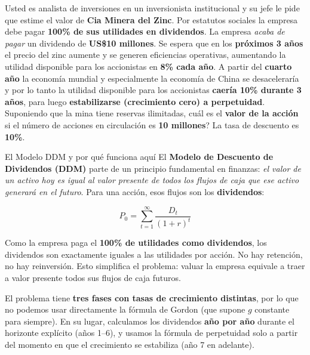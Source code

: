 \documentclass[12pt,a4paper]{article}
\begin{document}
\begin{cajaenunciado}
Usted es analista de inversiones en un inversionista institucional y su jefe le pide que estime
el valor de \textbf{Cia Minera del Zinc}. Por estatutos sociales la empresa debe pagar
\textbf{100\% de sus utilidades en dividendos}. La empresa \emph{acaba de pagar} un dividendo
de \textbf{US\$10 millones}. Se espera que en los \textbf{pr\'oximos 3 a\~nos} el precio del
zinc aumente y se generen eficiencias operativas, aumentando la utilidad disponible para los
accionistas en \textbf{8\% cada a\~no}. A partir del \textbf{cuarto a\~no} la econom\'ia
mundial y especialmente la econom\'ia de China se desaceleraría y por lo tanto la utilidad
disponible para los accionistas \textbf{caer\'ia 10\% durante 3 a\~nos}, para luego
\textbf{estabilizarse (crecimiento cero) a perpetuidad}. Suponiendo que la mina tiene reservas
ilimitadas, \textquestiondown cu\'al es el \textbf{valor de la acci\'on} si el n\'umero de
acciones en circulaci\'on es \textbf{10 millones}? La tasa de descuento es \textbf{10\%}.
\end{cajaenunciado}

\vspace{0.5cm}

\begin{cajaintuicion}{El Modelo DDM y por qu\'e funciona aqu\'i}
El \textbf{Modelo de Descuento de Dividendos (DDM)} parte de un principio fundamental en
finanzas: \textit{el valor de un activo hoy es igual al valor presente de todos los flujos
de caja que ese activo generar\'a en el futuro}. Para una acci\'on, esos flujos son los
\textbf{dividendos}:

\[
P_0 = \sum_{t=1}^{\infty} \frac{D_t}{(1+r)^t}
\]

Como la empresa paga el \textbf{100\% de utilidades como dividendos}, los dividendos son
exactamente iguales a las utilidades por acci\'on. No hay retenci\'on, no hay reinversi\'on.
Esto simplifica el problema: valuar la empresa equivale a traer a valor presente todos sus
flujos de caja futuros.

El problema tiene \textbf{tres fases con tasas de crecimiento distintas}, por lo que no
podemos usar directamente la f\'ormula de Gordon (que supone $g$ constante para siempre).
En su lugar, calculamos los dividendos \textbf{a\~no por a\~no} durante el horizonte
expl\'icito (a\~nos 1--6), y usamos la f\'ormula de perpetuidad solo a partir del momento
en que el crecimiento se estabiliza (a\~no 7 en adelante).
\end{cajaintuicion}
\end{document}
